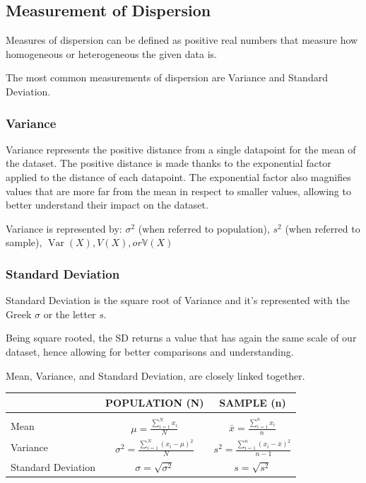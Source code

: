 \documentclass{article}
\begin{document}
\subsection{Measurement of Dispersion}
Measures of dispersion can be defined as positive real numbers that measure how homogeneous or heterogeneous the given data is. 

The most common measurements of dispersion are Variance and Standard Deviation. 

\subsubsection{Variance}
Variance represents the positive distance from a single datapoint for the mean of the dataset. The positive distance is made thanks to the exponential factor applied to the distance of each datapoint. 
The exponential factor also magnifies values that are more far from the mean in respect to smaller values, allowing to better understand their impact on the dataset. 

Variance is represented by: $\sigma ^{2}$ (when referred to population), ${\displaystyle s^{2}}$ (when referred to sample), ${\displaystyle \operatorname {Var} (X)}, {\displaystyle V(X)}, or {\displaystyle \mathbb {V} (X)}$

\subsubsection{Standard Deviation}
Standard Deviation is the square root of Variance and it’s represented with the Greek $\sigma$ or the letter $s$.

Being square rooted, the SD returns a value that has again the same scale of our dataset, hence allowing for better comparisons and understanding. 

Mean, Variance, and Standard Deviation, are closely linked together. 

\begin{center}
\begin{tabular}{|m{2cm}|c|c|}
\hline
& POPULATION (N) & SAMPLE (n) \\ \hline
&&\\[-1em]
Mean & $\displaystyle \mu = \frac{\sum\limits _{i=1}^{N} x_{i}}{N}$ & $\displaystyle \bar{x} = \frac{\sum\limits _{i=1}^{n} x_{i}}{n}$ \\[25pt]
Variance & $\displaystyle \sigma^2 = \frac{\sum\limits _{i=1}^{N} (x_{i} - \mu)^2}{N}$ & $\displaystyle s^2 = \frac{\sum\limits _{i=1}^{n} (x_{i} - \bar{x})^2}{n-1}$ \\[25pt]
Standard Deviation & $\displaystyle \sigma = \sqrt{\sigma^2}$ & $\displaystyle s = \sqrt{s^2}$ \\[25pt] 
\hline
\end{tabular}
\end{center}
\end{document}
